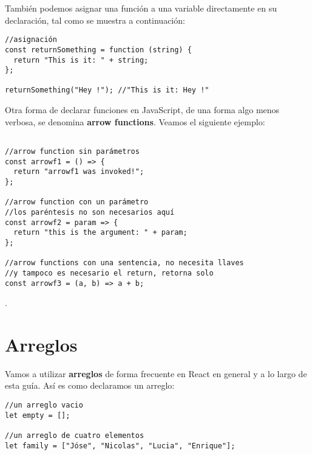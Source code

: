 \documentclass[a4paper, oneside, titlepage, 12pt]{paper}
\begin{document}
También podemos asignar una función a una variable directamente en su declaración, tal como se muestra a continuación:

\begin{verbatim}
//asignación
const returnSomething = function (string) {
  return "This is it: " + string;
};

returnSomething("Hey !"); //"This is it: Hey !"
\end{verbatim}

Otra forma de declarar funciones en JavaScript, de una forma algo menos verbosa, se denomina \textbf{arrow functions}. Veamos el siguiente ejemplo:

\begin{verbatim}
               
//arrow function sin parámetros
const arrowf1 = () => {
  return "arrowf1 was invoked!";
};

//arrow function con un parámetro
//los paréntesis no son necesarios aquí
const arrowf2 = param => {
  return "this is the argument: " + param;
};

//arrow functions con una sentencia, no necesita llaves 
//y tampoco es necesario el return, retorna solo 
const arrowf3 = (a, b) => a + b;
\end{verbatim}

.

\section{Arreglos} \label{arrays}

Vamos a utilizar \textbf{arreglos} de forma frecuente en React en general y a lo largo de esta guía. Así es como declaramos un arreglo:

\begin{verbatim}
//un arreglo vacio
let empty = [];

//un arreglo de cuatro elementos
let family = ["Jóse", "Nicolas", "Lucia", "Enrique"];
\end{verbatim}
\end{document}
